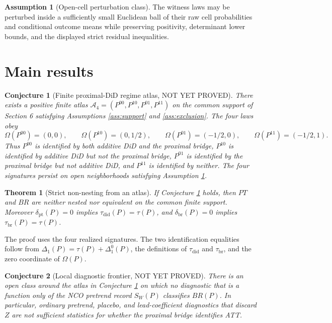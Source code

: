 \documentclass[11pt]{article}
\theoremstyle{definition}
\newtheorem{assumption}{Assumption}
\theoremstyle{plain}
\newtheorem{theorem}{Theorem}
\newtheorem{conjecture}{Conjecture}
\theoremstyle{remark}
\begin{document}
\begin{assumption}[Open-cell perturbation class]\label{ass:open}
The witness laws may be perturbed inside a sufficiently small Euclidean ball of their raw cell probabilities and conditional outcome means while preserving positivity, determinant lower bounds, and the displayed strict residual inequalities.
\end{assumption}

\section{Main results}
\begin{conjecture}[Finite proximal-DiD regime atlas, NOT YET PROVED]\label{conj:atlas}
There exists a positive finite atlas \(\mathcal A_4=(P^{00},P^{10},P^{01},P^{11})\) on the common support of Section 6 satisfying Assumptions \ref{ass:support} and \ref{ass:exclusion}. The four laws obey
\[
  \Omega(P^{00})=(0,0),\qquad
  \Omega(P^{10})=(0,1/2),\qquad
  \Omega(P^{01})=(-1/2,0),\qquad
  \Omega(P^{11})=(-1/2,1).
\]
Thus \(P^{00}\) is identified by both additive DiD and the proximal bridge, \(P^{10}\) is identified by additive DiD but not the proximal bridge, \(P^{01}\) is identified by the proximal bridge but not additive DiD, and \(P^{11}\) is identified by neither. The four signatures persist on open neighborhoods satisfying Assumption \ref{ass:open}.
\end{conjecture}

\begin{theorem}[Strict non-nesting from an atlas]\label{thm:nonnesting}
If Conjecture \ref{conj:atlas} holds, then \(PT\) and \(BR\) are neither nested nor equivalent on the common finite support. Moreover \(\delta_{\mathrm{pt}}(P)=0\) implies \(\tau_{\mathrm{did}}(P)=\tau(P)\), and \(\delta_{\mathrm{br}}(P)=0\) implies \(\tau_{\mathrm{br}}(P)=\tau(P)\).
\end{theorem}
The proof uses the four realized signatures. The two identification equalities follow from \(\Delta_1(P)=\tau(P)+\Delta^0_1(P)\), the definitions of \(\tau_{\mathrm{did}}\) and \(\tau_{\mathrm{br}}\), and the zero coordinate of \(\Omega(P)\).

\begin{conjecture}[Local diagnostic frontier, NOT YET PROVED]\label{conj:frontier}
There is an open class around the atlas in Conjecture \ref{conj:atlas} on which no diagnostic that is a function only of the NCO pretrend record \(S_W(P)\) classifies \(BR(P)\). In particular, ordinary pretrend, placebo, and lead-coefficient diagnostics that discard \(Z\) are not sufficient statistics for whether the proximal bridge identifies ATT.
\end{conjecture}
\end{document}
